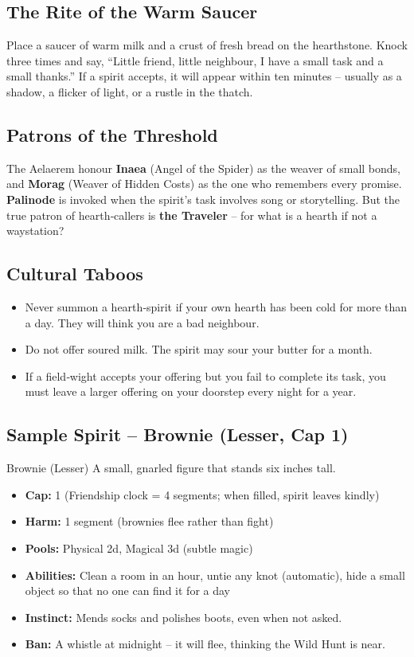 \documentclass[10pt,a5paper]{book}
\begin{document}
\subsection*{The Rite of the Warm Saucer}
Place a saucer of warm milk and a crust of fresh bread on the hearthstone. Knock three times and say, “Little friend, little neighbour, I have a small task and a small thanks.” If a spirit accepts, it will appear within ten minutes – usually as a shadow, a flicker of light, or a rustle in the thatch.

\subsection*{Patrons of the Threshold}
The Aelaerem honour \textbf{Inaea} (Angel of the Spider) as the weaver of small bonds, and \textbf{Morag} (Weaver of Hidden Costs) as the one who remembers every promise. \textbf{Palinode} is invoked when the spirit’s task involves song or storytelling. But the true patron of hearth‑callers is \textbf{the Traveler} – for what is a hearth if not a waystation?

\subsection*{Cultural Taboos}
\begin{itemize}
    \item Never summon a hearth‑spirit if your own hearth has been cold for more than a day. They will think you are a bad neighbour.
    \item Do not offer soured milk. The spirit may sour your butter for a month.
    \item If a field‑wight accepts your offering but you fail to complete its task, you must leave a larger offering on your doorstep every night for a year.
\end{itemize}

\subsection*{Sample Spirit – Brownie (Lesser, Cap 1)}
\begin{spiritcard}{Brownie (Lesser)}
A small, gnarled figure that stands six inches tall.
\begin{itemize}
    \item \textbf{Cap:} 1 (Friendship clock = 4 segments; when filled, spirit leaves kindly)
    \item \textbf{Harm:} 1 segment (brownies flee rather than fight)
    \item \textbf{Pools:} Physical 2d, Magical 3d (subtle magic)
    \item \textbf{Abilities:} Clean a room in an hour, untie any knot (automatic), hide a small object so that no one can find it for a day
    \item \textbf{Instinct:} Mends socks and polishes boots, even when not asked.
    \item \textbf{Ban:} A whistle at midnight – it will flee, thinking the Wild Hunt is near.
\end{itemize}
\end{spiritcard}
\end{document}
